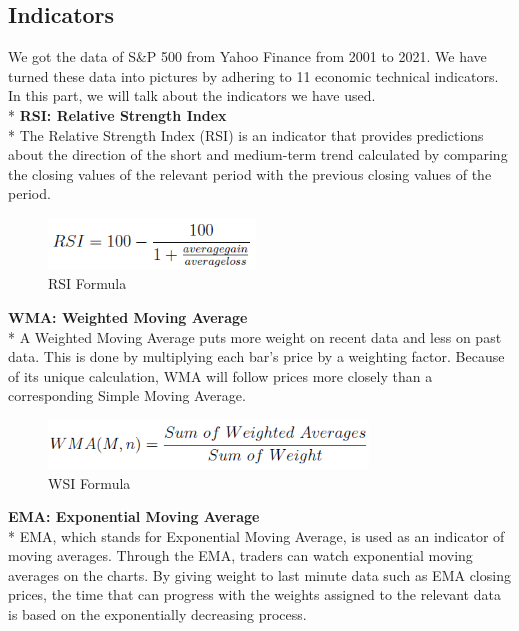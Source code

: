 \documentclass[]{article}
\begin{document}
\subsection{Indicators}
We got the data of S\&P 500 from Yahoo Finance from 2001 to 2021. We have turned these data into pictures by adhering to 11 economic technical indicators. In this part, we will talk about the indicators we have used.\vspace{0.3cm}\\*
\textbf{RSI: Relative Strength Index}\\*
The Relative Strength Index (RSI) is an indicator that provides predictions about the direction of the short and medium-term trend calculated by comparing the closing values of the relevant period with the previous closing values of the period.
\begin{figure}[H]
\begin{center}
   \includegraphics[width=55mm,scale=0.5]{assets/formulas/rsi.png}
   \caption{RSI Formula}
\end{center}
\end{figure}
\noindent
\textbf{WMA: Weighted Moving Average} \\*
A Weighted Moving Average puts more weight on recent data and less on past data. This is done by multiplying each bar’s price by a weighting factor. Because of its unique calculation, WMA will follow prices more closely than a corresponding Simple Moving Average.
\begin{figure}[H]
\begin{center}
   \includegraphics[width=85mm,scale=0.8]{assets/formulas/wma.png}
   \caption{WSI Formula}
\end{center}
\end{figure}
\noindent
\textbf{EMA: Exponential Moving Average} \\*
EMA, which stands for Exponential Moving Average, is used as an indicator of moving averages. Through the EMA, traders can watch exponential moving averages on the charts. By giving weight to last minute data such as EMA closing prices, the time that can progress with the weights assigned to the relevant data is based on the exponentially decreasing process.
\end{document}
